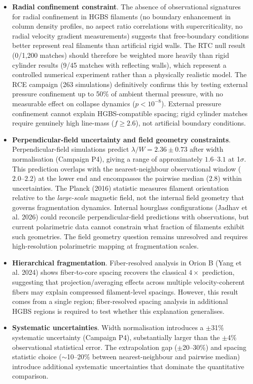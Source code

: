 \documentclass[twocolumn,usenatbib]{mnras}
\begin{document}
\begin{itemize}
    \item \textbf{Radial confinement constraint}. The absence of observational signatures for radial confinement in HGBS filaments (no boundary enhancement in column density profiles, no aspect ratio correlations with supercriticality, no radial velocity gradient measurements) suggests that free-boundary conditions better represent real filaments than artificial rigid walls. The RTC null result (0/1,200 matches) should therefore be weighted more heavily than rigid cylinder results (9/45 matches with reflecting walls), which represent a controlled numerical experiment rather than a physically realistic model. The RCE campaign (263 simulations) definitively confirms this by testing external pressure confinement up to 50\% of ambient thermal pressure, with no measurable effect on collapse dynamics ($p < 10^{-8}$). External pressure confinement cannot explain HGBS-compatible spacing; rigid cylinder matches require genuinely high line-mass ($f \geq 2.6$), not artificial boundary conditions.

    \item \textbf{Perpendicular-field uncertainty and field geometry constraints}. Perpendicular-field simulations predict $\lambda/W = 2.36 \pm 0.73$ after width normalisation (Campaign P4), giving a range of approximately $1.6$--$3.1$ at 1$\sigma$. This prediction overlaps with the nearest-neighbour observational window ($2.0$--$2.2$) at the lower end and encompasses the pairwise median ($2.8$) within uncertainties. The Planck (2016) statistic measures filament orientation relative to the \textit{large-scale} magnetic field, not the internal field geometry that governs fragmentation dynamics. Internal hourglass configurations (Jadhav et al. 2026) could reconcile perpendicular-field predictions with observations, but current polarimetric data cannot constrain what fraction of filaments exhibit such geometries. The field geometry question remains unresolved and requires high-resolution polarimetric mapping at fragmentation scales.

    \item \textbf{Hierarchical fragmentation}. Fiber-resolved analysis in Orion B (Yang et al. 2024) shows fiber-to-core spacing recovers the classical $4\times$ prediction, suggesting that projection/averaging effects across multiple velocity-coherent fibers may explain compressed filament-level spacings. However, this result comes from a single region; fiber-resolved spacing analysis in additional HGBS regions is required to test whether this explanation generalises.

    \item \textbf{Systematic uncertainties}. Width normalisation introduces a $\pm$31\% systematic uncertainty (Campaign P4), substantially larger than the $\pm$4\% observational statistical error. The extrapolation gap ($\pm$20--30\%) and spacing statistic choice ($\sim$10--20\% between nearest-neighbour and pairwise median) introduce additional systematic uncertainties that dominate the quantitative comparison.
\end{itemize}
\end{document}
